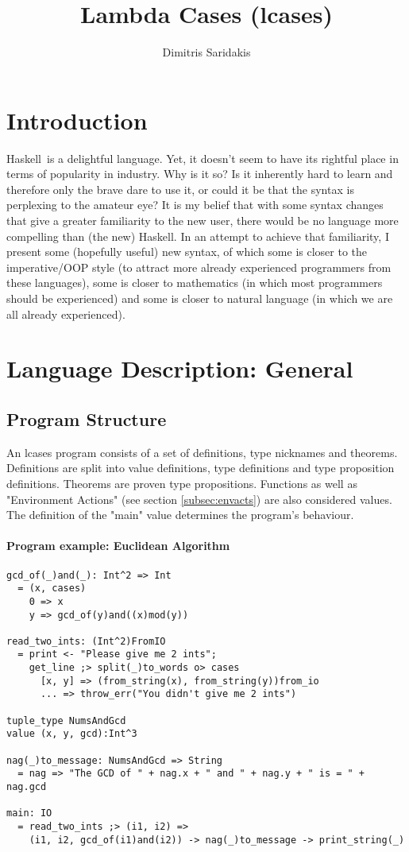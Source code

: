 \documentclass{article}
\date{}
\author{
  Dimitris Saridakis
}
\def\H{Haskell}
\begin{document}
\title{
\textbf{Lambda Cases (lcases)}
}
\maketitle

\tableofcontents

\newpage
\section{Introduction}

\H\ is a delightful language. Yet, it doesn't seem to have its rightful place
in terms of popularity in industry. Why is it so?  Is it inherently hard to
learn and therefore only the brave dare to use it, or could it be that the
syntax is perplexing to the amateur eye? It is my belief that with some syntax
changes that give a greater familiarity to the new user, there would be no
language more compelling than (the new) \H. In an attempt to achieve that
familiarity, I present some (hopefully useful) new syntax, of which some is
closer to the imperative/OOP style (to attract more already experienced
programmers from these languages), some is closer to mathematics (in which most
programmers should be experienced) and some is closer to natural language (in
which we are all already experienced).

\section{Language Description: General}

\subsection{Program Structure}

An lcases program consists of a set of definitions, type nicknames and
theorems.  Definitions are split into value definitions, type definitions and
type proposition definitions. Theorems are proven type propositions. Functions
as well as "Environment Actions" (see section \ref{subsec:envacts}) are also
considered values. The definition of the "main" value determines the program's
behaviour.

\paragraph{Program example: Euclidean Algorithm}
\begin{verbatim}
gcd_of(_)and(_): Int^2 => Int
  = (x, cases)
    0 => x
    y => gcd_of(y)and((x)mod(y))

read_two_ints: (Int^2)FromIO
  = print <- "Please give me 2 ints";
    get_line ;> split(_)to_words o> cases
      [x, y] => (from_string(x), from_string(y))from_io
      ... => throw_err("You didn't give me 2 ints")

tuple_type NumsAndGcd
value (x, y, gcd):Int^3

nag(_)to_message: NumsAndGcd => String
  = nag => "The GCD of " + nag.x + " and " + nag.y + " is = " + nag.gcd

main: IO
  = read_two_ints ;> (i1, i2) =>
    (i1, i2, gcd_of(i1)and(i2)) -> nag(_)to_message -> print_string(_)
\end{verbatim}
\end{document}
